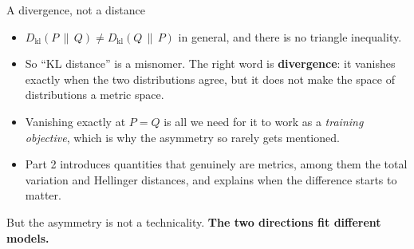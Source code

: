 \documentclass[aspectratio=169,9pt]{beamer}
\newcommand{\orange}[1]{\textcolor{AmazonOrange}{\textbf{#1}}}
\newcommand{\muted}[1]{\textcolor{EPICMuted}{#1}}
\newcommand{\KL}[2]{D_{\mathrm{kl}}\!\left(#1 \,\|\, #2\right)}
\begin{document}
\begin{frame}{A divergence, not a distance}
\begin{itemize}
    \item $\KL{P}{Q} \ne \KL{Q}{P}$ in general, and there is no triangle inequality.
    \pause
    \item So ``KL distance'' is a misnomer. The right word is \orange{divergence}: it vanishes exactly when
    the two distributions agree, but it does not make the space of distributions a metric space.
    \pause
    \item Vanishing exactly at $P = Q$ is all we need for it to work as a \textit{training objective}, which
    is why the asymmetry so rarely gets mentioned.
    \pause
    \item \muted{Part 2 introduces quantities that genuinely are metrics, among them the total variation and
    Hellinger distances, and explains when the difference starts to matter.}
\end{itemize}
\vspace{0.3cm}
\pause
\begin{center}
\large But the asymmetry is not a technicality. \orange{The two directions fit different models.}
\end{center}
\end{frame}
\end{document}
